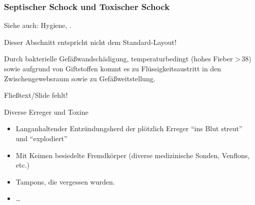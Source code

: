 


\subsubsection{Septischer Schock und Toxischer Schock}
\label{topic:schock-septischer}
\label{topic:schock-toxischer}
Siehe auch: Hygiene, .


{Dieser Abschnitt entspricht nicht dem Standard-Layout!}

Durch bakterielle Gefäßwandschädigung, temperaturbedingt (hohes
Fieber {\textgreater}\,38{\textcelsius}) sowie aufgrund von
Giftstoffen kommt es zu Flüssigkeitsaustritt in den Zwischen\-gewebs\-raum sowie
zu Gefäßweitstellung.

{

   {Fließtext/Slide fehlt!}

Diverse Erreger und Toxine

\begin{itemize}
  \item Langanhaltender Entzündungsherd der plötzlich Erreger
  "`ins Blut streut"' und "`explodiert"'
  \item Mit Keimen besiedelte Fremdkörper (diverse
  medizinische Sonden, Venflons, etc.)
  \item Tampons, die vergessen wurden.
  \item \ldots
\end{itemize}
}{}{}{}{}




